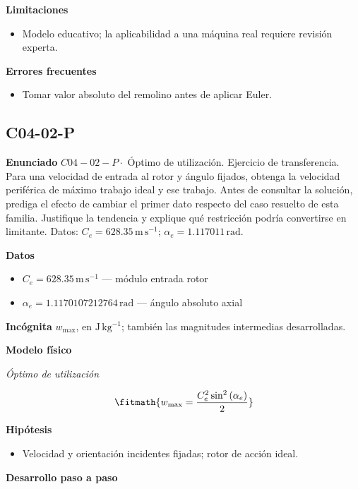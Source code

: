 \documentclass[10pt,openany]{book}
\begin{document}
\noindent\textbf{Limitaciones}
\begin{itemize}
\item Modelo educativo; la aplicabilidad a una máquina real requiere revisión experta.
\end{itemize}

\noindent\textbf{Errores frecuentes}
\begin{itemize}
\item Tomar valor absoluto del remolino antes de aplicar Euler.
\end{itemize}
\subsection*{C04-02-P}

\noindent\textbf{Enunciado}
\(C04-02-P \cdot\) Óptimo de utilización. Ejercicio de transferencia. Para una velocidad de entrada al rotor y ángulo fijados, obtenga la velocidad periférica de máximo trabajo ideal y ese trabajo. Antes de consultar la solución, prediga el efecto de cambiar el primer dato respecto del caso resuelto de esta familia. Justifique la tendencia y explique qué restricción podría convertirse en limitante. Datos: \(C_e=628.35\, \mathrm{m}\,\mathrm{s}^{-1}\); \(\alpha_e=1.117011\, \mathrm{rad}\).

\noindent\textbf{Datos}
\begin{itemize}
\item $C_e = 628.35\,\mathrm{m}\,\mathrm{s}^{-1}$ — módulo entrada rotor
\item $\alpha_e = 1.1170107212764\,\mathrm{rad}$ — ángulo absoluto axial
\end{itemize}

\noindent\textbf{Incógnita}
$w_{\max}$, en $\mathrm{J\,kg^{-1}}$; también las magnitudes intermedias desarrolladas.

\noindent\textbf{Modelo físico}

\noindent\textit{Óptimo de utilización}

\[
\fitmath{w_{\max}=\frac{C_e^{2} \sin^{2}{\left(\alpha_e \right)}}{2}}
\]

\noindent\textbf{Hipótesis}
\begin{itemize}
\item Velocidad y orientación incidentes fijadas; rotor de acción ideal.
\end{itemize}

\noindent\textbf{Desarrollo paso a paso}
\end{document}
